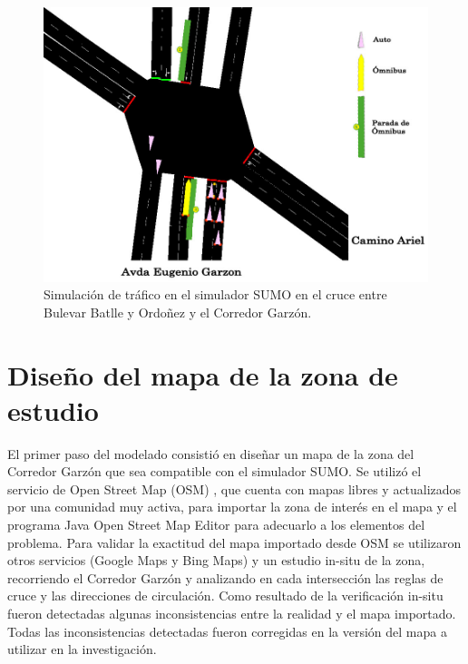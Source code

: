 \begin{figure}[ht]
	\centering
	\includegraphics[width=0.9\linewidth]{Figures/sim1}
	\caption[Simulación de trafico en el simulador SUMO.]{Simulación de tráfico en el simulador SUMO en el cruce entre Bulevar Batlle y Ordoñez y el Corredor Garzón.}
	\label{fig:sim1}
\end{figure}





\section{Diseño del mapa de la zona de estudio}

El primer paso del modelado consistió en diseñar un mapa de la zona del Corredor Garzón que sea compatible con el simulador SUMO. Se utilizó el servicio de Open Street Map (OSM) \cite{OSM}, que cuenta con mapas libres y actualizados por una comunidad muy activa, para importar la zona de interés en el mapa y el programa Java Open Street Map Editor para adecuarlo a los elementos del problema. Para validar la exactitud del mapa importado desde OSM se utilizaron otros servicios (Google Maps y Bing Maps) y un estudio in-situ de la zona, recorriendo el Corredor Garzón y analizando en cada intersección las reglas de cruce y las direcciones de circulación. Como resultado de la verificación in-situ fueron detectadas algunas inconsistencias entre la realidad y el mapa importado. Todas las inconsistencias detectadas fueron corregidas en la versión del mapa a utilizar en la investigación. 

